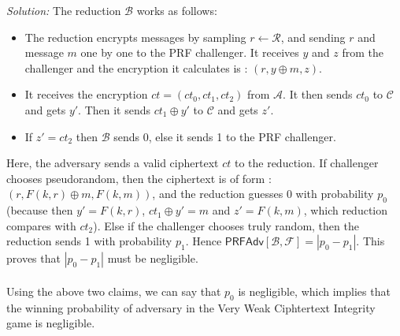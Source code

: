 \documentclass[a4paper, 11pt]{article}
\newenvironment{solution}
    {\textit{Solution:}}
    {\clearpage}
\newcommand{\prf}{\mathsf{PRFAdv}}
\newcommand{\calA}{\mathcal{A}}
\newcommand{\calB}{\mathcal{B}}
\newcommand{\calC}{\mathcal{C}}
\newcommand{\calF}{\mathcal{F}}
\newcommand{\calR}{\mathcal{R}}
\begin{document}
\begin{solution}
    The reduction $\calB$ works as follows:
    \begin{itemize}
        \item The reduction encrypts messages by sampling $r \leftarrow \calR$, and sending $r$ and message $m$ one by one to the PRF challenger. It receives $y$ and $z$ from the challenger and the encryption it calculates is : $(r, y \oplus m, z)$.
        \item It receives the encryption $ct = (ct_0, ct_1, ct_2)$ from $\calA$. It then sends $ct_0$ to $\calC$ and gets $y'$. Then it sends $ct_1 \oplus y'$ to $\calC$ and gets $z'$.
        \item  If $z' = ct_2$ then $\calB$ sends 0, else it sends 1 to the PRF challenger.
    \end{itemize}
    Here, the adversary sends a valid ciphertext $ct$ to the reduction. If challenger chooses pseudorandom, then the ciphertext is of form : $(r, F(k, r) \oplus m, F(k, m))$, and the reduction guesses 0 with probability $p_0$ (because then $y' = F(k, r)$, $ct_1 \oplus y' = m$ and $z' = F(k, m)$, which reduction compares with $ct_2$). Else if the challenger chooses truly random, then the reduction sends 1 with probability $p_1$. Hence $ \prf[\calB, \calF] = | p_0 - p_1 | $. This proves that $| p_0 - p_1 |$ must be negligible.\\ \\
    Using the above two claims, we can say that $p_0$ is negligible, which implies that the winning probability of adversary in the Very Weak Ciphtertext Integrity game is negligible.
\end{solution}
\end{document}

